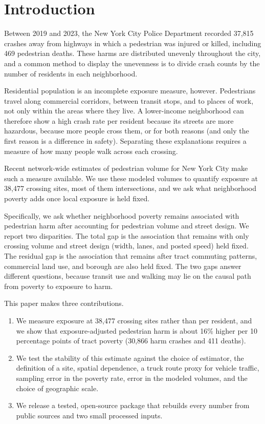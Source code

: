 \documentclass[10pt,twocolumn]{article}
\begin{document}
\section{Introduction}
Between 2019 and 2023, the New York City Police Department recorded 37,815 crashes away from highways in which a pedestrian was injured or killed, including 469 pedestrian deaths. These harms are distributed unevenly throughout the city, and a common method to display the unevenness is to divide crash counts by the number of residents in each neighborhood.

Residential population is an incomplete exposure measure, however. Pedestrians travel along commercial corridors, between transit stops, and to places of work, not only within the areas where they live. A lower-income neighborhood can therefore show a high crash rate per resident because its streets are more hazardous, because more people cross them, or for both reasons (and only the first reason is a difference in safety). Separating these explanations requires a measure of how many people walk across each crossing.

Recent network-wide estimates of pedestrian volume for New York City \citep{sevtsuk2026nycwalks} make such a measure available. We use these modeled volumes to quantify exposure at 38,477 crossing sites, most of them intersections, and we ask what neighborhood poverty adds once local exposure is held fixed.

Specifically, we ask whether neighborhood poverty remains associated with pedestrian harm after accounting for pedestrian volume and street design. We report two disparities. The total gap is the association that remains with only crossing volume and street design (width, lanes, and posted speed) held fixed. The residual gap is the association that remains after tract commuting patterns, commercial land use, and borough are also held fixed. The two gaps answer different questions, because transit use and walking may lie on the causal path from poverty to exposure to harm.

This paper makes three contributions.
\begin{enumerate}
\item We measure exposure at 38,477 crossing sites rather than per resident, and we show that exposure-adjusted pedestrian harm is about 16\% higher per 10 percentage points of tract poverty (30,866 harm crashes and 411 deaths).
\item We test the stability of this estimate against the choice of estimator, the definition of a site, spatial dependence, a truck route proxy for vehicle traffic, sampling error in the poverty rate, error in the modeled volumes, and the choice of geographic scale.
\item We release a tested, open-source package that rebuilds every number from public sources and two small processed inputs.
\end{enumerate}
\end{document}
